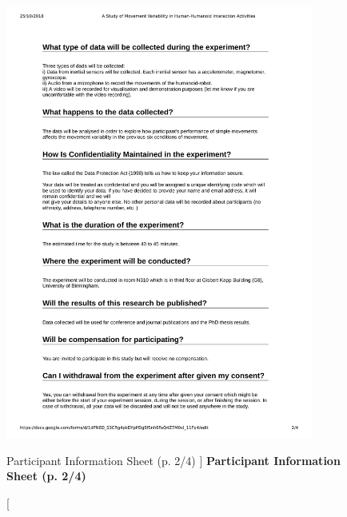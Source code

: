 \begin{figure}
 \centering
   \includegraphics[width=0.9\textwidth]{epi2}
   \caption
	[Participant Information Sheet (p. 2/4) ]{
	{\bf Participant Information Sheet (p. 2/4)}
}
   \label{fig:epi2}
\end{figure}
